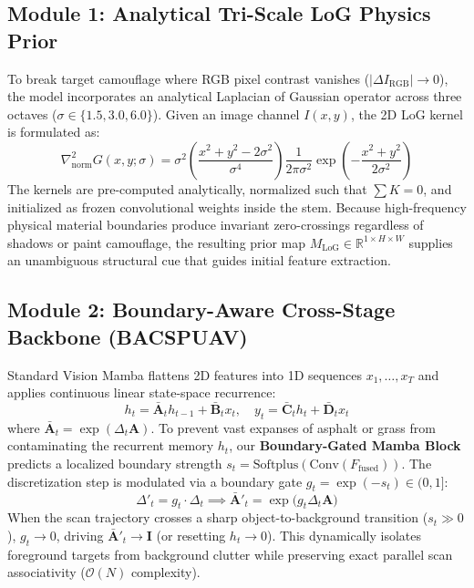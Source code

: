 \documentclass[12pt,a4paper]{report}
\begin{document}
\subsection{Module 1: Analytical Tri-Scale LoG Physics Prior}
To break target camouflage where RGB pixel contrast vanishes ($|\Delta I_{\text{RGB}}| \to 0$), the model incorporates an analytical Laplacian of Gaussian operator across three octaves ($\sigma \in \{1.5, 3.0, 6.0\}$). Given an image channel $I(x, y)$, the 2D LoG kernel is formulated as:
\begin{equation}
    \nabla^2_{\text{norm}} G(x, y; \sigma) = \sigma^2 \left( \frac{x^2 + y^2 - 2\sigma^2}{\sigma^4} \right) \frac{1}{2\pi\sigma^2} \exp\left(-\frac{x^2 + y^2}{2\sigma^2}\right)
\end{equation}
The kernels are pre-computed analytically, normalized such that $\sum K = 0$, and initialized as frozen convolutional weights inside the stem. Because high-frequency physical material boundaries produce invariant zero-crossings regardless of shadows or paint camouflage, the resulting prior map $M_{\text{LoG}} \in \mathbb{R}^{1 \times H \times W}$ supplies an unambiguous structural cue that guides initial feature extraction.

\subsection{Module 2: Boundary-Aware Cross-Stage Backbone (BACSPUAV)}
Standard Vision Mamba flattens 2D features into 1D sequences $x_1, \dots, x_T$ and applies continuous linear state-space recurrence:
\begin{equation}
    h_t = \mathbf{\bar{A}}_t h_{t-1} + \mathbf{\bar{B}}_t x_t, \quad y_t = \mathbf{\bar{C}}_t h_t + \mathbf{\bar{D}}_t x_t
\end{equation}
where $\mathbf{\bar{A}}_t = \exp(\Delta_t \mathbf{A})$. To prevent vast expanses of asphalt or grass from contaminating the recurrent memory $h_t$, our \textbf{Boundary-Gated Mamba Block} predicts a localized boundary strength $s_t = \text{Softplus}(\text{Conv}(F_{\text{fused}}))$. The discretization step is modulated via a boundary gate $g_t = \exp(-s_t) \in (0, 1]$:
\begin{equation}
    \Delta'_t = g_t \cdot \Delta_t \implies \mathbf{\bar{A}}'_t = \exp\big(g_t \Delta_t \mathbf{A}\big)
\end{equation}
When the scan trajectory crosses a sharp object-to-background transition ($s_t \gg 0$), $g_t \to 0$, driving $\mathbf{\bar{A}}'_t \to \mathbf{I}$ (or resetting $h_t \to 0$). This dynamically isolates foreground targets from background clutter while preserving exact parallel scan associativity ($\mathcal{O}(N)$ complexity).
\end{document}
